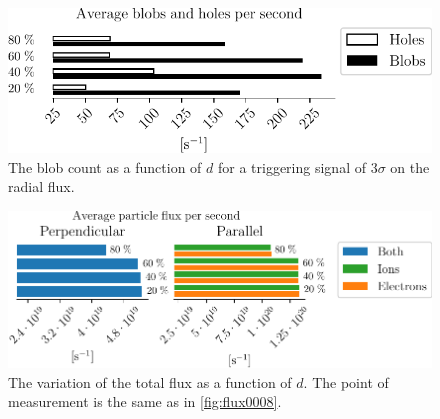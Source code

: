 %
\begin{figure}[htb]
    \centering
    \includegraphics{fig/results/neutral/nnScanBlobCount}
    \caption{The blob count as a function of $d$ for a triggering signal of $3\sigma$ on the radial flux.}
    \label{fig:nnScanBlobCount}
\end{figure}
%

%
\begin{figure}[htb]
    \centering
    \includegraphics{fig/results/neutral/nnScanTotalFlux}
    \caption{
        The variation of the total flux as a function of $d$.
        The point of measurement is the same as in \cref{fig:flux0008}.
    }
    \label{fig:nnScanTotalFlux}
\end{figure}
%
